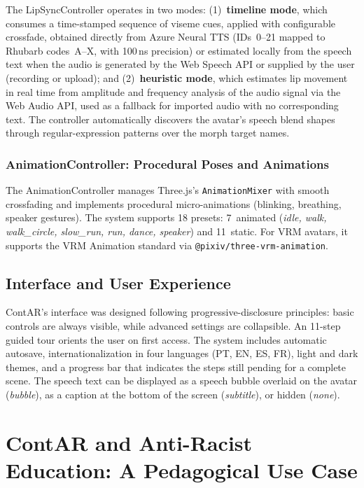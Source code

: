 \documentclass[conference]{IEEEtran}
\begin{document}
The LipSyncController operates in two modes: (1)~\textbf{timeline mode}, which
consumes a time-stamped sequence of viseme cues, applied with configurable
crossfade, obtained directly from Azure Neural TTS (IDs~0--21 mapped to
Rhubarb codes~A--X, with 100\,ns precision) or estimated locally from the
speech text when the audio is generated by the Web Speech API or supplied by
the user (recording or upload); and (2)~\textbf{heuristic mode}, which
estimates lip movement in real time from amplitude and frequency analysis of
the audio signal via the Web Audio API, used as a fallback for imported audio
with no corresponding text. The controller automatically discovers the
avatar's speech blend shapes through regular-expression patterns over the
morph target names.

\subsubsection{AnimationController: Procedural Poses and Animations}

The AnimationController manages Three.js's \texttt{AnimationMixer} with
smooth crossfading and implements procedural micro-animations (blinking,
breathing, speaker gestures). The system supports 18 presets: 7~animated
(\textit{idle, walk, walk\_circle, slow\_run, run, dance, speaker}) and
11~static. For VRM avatars, it supports the VRM Animation standard via
\texttt{@pixiv/three-vrm-animation}.

\subsection{Interface and User Experience}

ContAR's interface was designed following progressive-disclosure principles:
basic controls are always visible, while advanced settings are collapsible.
An 11-step guided tour orients the user on first access. The system includes
automatic autosave, internationalization in four languages (PT, EN, ES, FR),
light and dark themes, and a progress bar that indicates the steps still
pending for a complete scene. The speech text can be displayed as a speech
bubble overlaid on the avatar (\textit{bubble}), as a caption at the bottom of
the screen (\textit{subtitle}), or hidden (\textit{none}).

\section{ContAR and Anti-Racist Education: A Pedagogical Use Case}
\end{document}

